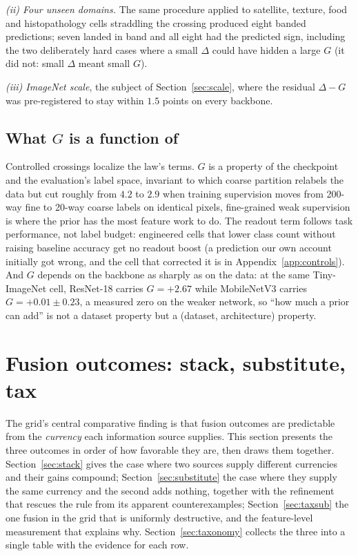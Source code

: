 \emph{(ii) Four unseen domains.} The same procedure applied to satellite,
texture, food and histopathology cells straddling the crossing produced
eight banded predictions; seven landed in band and all eight had the
predicted sign, including the two deliberately hard cases where a small
$\Delta$ could have hidden a large $G$ (it did not: small $\Delta$ meant
small $G$).

\emph{(iii) ImageNet scale}, the subject of Section~\ref{sec:scale},
where the residual $\Delta - G$ was pre-registered to stay within
$1.5$ points on every backbone.

\subsection{What $G$ is a function of}\label{sec:lawG}
Controlled crossings localize the law's terms. $G$ is a property of the
checkpoint and the evaluation's label space, invariant to which coarse
partition relabels the data but cut roughly from $4.2$ to $2.9$ when
training supervision moves from 200-way fine to 20-way coarse labels on
identical pixels, fine-grained weak supervision is where the prior has
the most feature work to do. The readout term follows task performance,
not label budget: engineered cells that lower class count without raising
baseline accuracy get no readout boost (a prediction our own account
initially got wrong, and the cell that corrected it is in
Appendix~\ref{app:controls}). And $G$ depends on the backbone as sharply
as on the data: at the same Tiny-ImageNet cell, ResNet-18 carries
$G = +2.67$ while MobileNetV3 carries $G = +0.01 \pm 0.23$, a measured
zero on the weaker network, so ``how much a prior can add'' is not a
dataset property but a (dataset, architecture) property.

\section{Fusion outcomes: stack, substitute, tax}\label{sec:fusion}

The grid's central comparative finding is that fusion outcomes are
predictable from the \emph{currency} each information source supplies.
This section presents the three outcomes in order of how favorable they
are, then draws them together. Section~\ref{sec:stack} gives the case
where two sources supply different currencies and their gains compound;
Section~\ref{sec:substitute} the case where they supply the same currency
and the second adds nothing, together with the refinement that rescues
the rule from its apparent counterexamples;
Section~\ref{sec:taxsub} the one fusion in the grid that is uniformly
destructive, and the feature-level measurement that explains why.
Section~\ref{sec:taxonomy} collects the three into a single table with
the evidence for each row.


